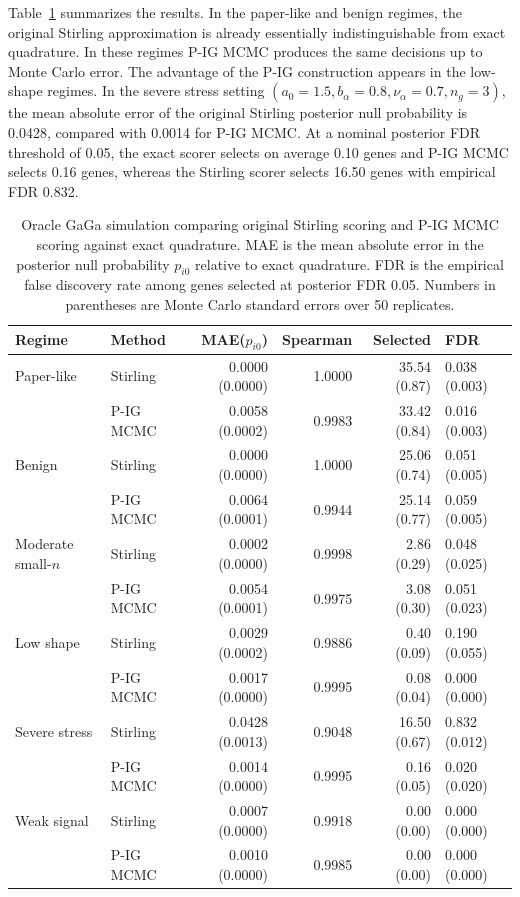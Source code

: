 Table~\ref{tab:gaga-oracle-simulation} summarizes the results.  In the
paper-like and benign regimes, the original Stirling approximation is already
essentially indistinguishable from exact quadrature.  In these regimes P-IG
MCMC produces the same decisions up to Monte Carlo error.  The advantage of
the P-IG construction appears in the low-shape regimes.  In the severe stress
setting $(a_0=1.5,b_\alpha=0.8,\nu_\alpha=0.7,n_g=3)$, the mean absolute error
of the original Stirling posterior null probability is 0.0428, compared with
0.0014 for P-IG MCMC.  At a nominal posterior FDR threshold of 0.05, the exact
scorer selects on average 0.10 genes and P-IG MCMC selects 0.16 genes, whereas
the Stirling scorer selects 16.50 genes with empirical FDR 0.832.

\begin{table}[t]
\centering
\caption{Oracle GaGa simulation comparing original Stirling scoring and
P-IG MCMC scoring against exact quadrature.  MAE is the mean absolute error in
the posterior null probability $p_{i0}$ relative to exact quadrature.  FDR is
the empirical false discovery rate among genes selected at posterior FDR 0.05.
Numbers in parentheses are Monte Carlo standard errors over 50 replicates.}
\label{tab:gaga-oracle-simulation}
\smallskip
\renewcommand{\arraystretch}{1.12}
\setlength{\tabcolsep}{4pt}
{\footnotesize
\begin{tabular}{@{}llrrrl@{}}
\toprule
\textbf{Regime} & \textbf{Method} &
\textbf{MAE($p_{i0}$)} &
\textbf{Spearman} &
\textbf{Selected} &
\textbf{FDR} \\
\midrule
Paper-like & Stirling & 0.0000 (0.0000) & 1.0000 & 35.54 (0.87) & 0.038 (0.003) \\
           & P-IG MCMC & 0.0058 (0.0002) & 0.9983 & 33.42 (0.84) & 0.016 (0.003) \\
Benign & Stirling & 0.0000 (0.0000) & 1.0000 & 25.06 (0.74) & 0.051 (0.005) \\
       & P-IG MCMC & 0.0064 (0.0001) & 0.9944 & 25.14 (0.77) & 0.059 (0.005) \\
Moderate small-$n$ & Stirling & 0.0002 (0.0000) & 0.9998 & 2.86 (0.29) & 0.048 (0.025) \\
                  & P-IG MCMC & 0.0054 (0.0001) & 0.9975 & 3.08 (0.30) & 0.051 (0.023) \\
Low shape & Stirling & 0.0029 (0.0002) & 0.9886 & 0.40 (0.09) & 0.190 (0.055) \\
          & P-IG MCMC & 0.0017 (0.0000) & 0.9995 & 0.08 (0.04) & 0.000 (0.000) \\
Severe stress & Stirling & 0.0428 (0.0013) & 0.9048 & 16.50 (0.67) & 0.832 (0.012) \\
              & P-IG MCMC & 0.0014 (0.0000) & 0.9995 & 0.16 (0.05) & 0.020 (0.020) \\
Weak signal & Stirling & 0.0007 (0.0000) & 0.9918 & 0.00 (0.00) & 0.000 (0.000) \\
            & P-IG MCMC & 0.0010 (0.0000) & 0.9985 & 0.00 (0.00) & 0.000 (0.000) \\
\bottomrule
\end{tabular}}
\end{table}

